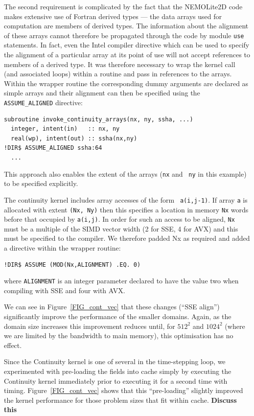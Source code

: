 \documentclass[12pt]{article}
\begin{document}
The second requirement is complicated by the fact that the NEMOLite2D
code makes extensive use of Fortran derived types --- the data arrays
used for computation are members of derived types. The information
about the alignment of these arrays cannot therefore be propagated
through the code by module {\tt use} statements. In fact, even the
Intel compiler directive which can be used to specify the alignment
of a particular array at its point of use will not accept references
to members of a derived type. It was therefore necessary to wrap the
kernel call (and associated loops) within a routine and pass in
references to the arrays. Within the wrapper routine the corresponding
dummy arguments are declared as simple arrays and their alignment can
then be specified using the {\tt ASSUME\_ALIGNED} directive:
\begin{verbatim}
subroutine invoke_continuity_arrays(nx, ny, ssha, ...)
  integer, intent(in)   :: nx, ny
  real(wp), intent(out) :: ssha(nx,ny)
!DIR$ ASSUME_ALIGNED ssha:64
  ...
\end{verbatim}
This approach also enables the extent of the arrays ({\tt nx} and {\tt
  ny} in this example) to be specified explicitly.

The continuity kernel includes array accesses of the form {\tt
  a(i,j-1)}. If array {\tt a} is allocated with extent {\tt (Nx, Ny)}
then this specifies a location in memory {\tt Nx} words before that
occupied by {\tt a(i,j)}. In order for such an access to be aligned,
{\tt Nx} must be a multiple of the SIMD vector width (2 for SSE, 4 for
AVX) and this must be specified to the compiler. We therefore padded Nx
as required and added a directive within the wrapper routine:
\begin{verbatim}
!DIR$ ASSUME (MOD(Nx,ALIGNMENT) .EQ. 0)
\end{verbatim}
where {\tt ALIGNMENT} is an integer parameter declared to have the value two
when compiling with SSE and four with AVX.

We can see in Figure~\ref{FIG_cont_vec} that these changes (``SSE
align'') significantly improve the performance of the smaller
domains. Again, as the domain size increases this improvement reduces
until, for $512^2$ and $1024^2$ (where we are limited by the bandwidth
to main memory), this optimisation has no effect.

Since the Continuity kernel is one of several in the time-stepping
loop, we experimented with pre-loading the fields into cache simply by
executing the Continuity kernel immediately prior to executing it for
a second time with timing. Figure~\ref{FIG_cont_vec} shows that this
``pre-loading'' slightly improved the kernel performance for those
problem sizes that fit within cache. {\bf Discuss this}
\end{document}
